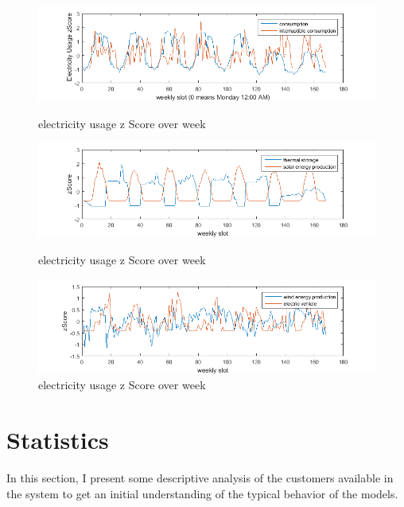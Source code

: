\begin{figure}
\centering
\includegraphics[scale=0.85]{weekly1.png}
\caption{electricity usage z Score over week}
\label{fig:weekly1}
\includegraphics[scale=0.85]{weekly2.png}
\caption{electricity usage z Score over week}
\label{fig:weekly2}
\includegraphics[scale=0.85]{weekly3.png}
\caption{electricity usage z Score over week}
\label{fig:weekly3}
\end{figure}


\section{Statistics}
In this section, I present some descriptive analysis of the customers available in the system to get an initial understanding of the typical behavior of the models. 

